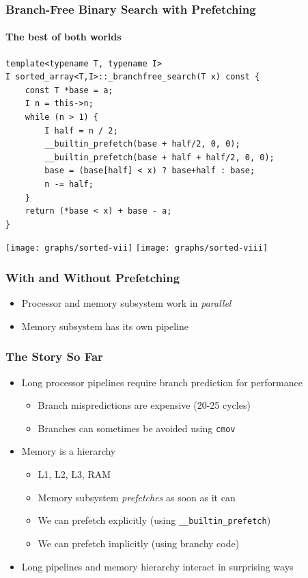 \documentclass[xcolor=dvipsnames]{beamer}
\begin{document}
\begin{frame}[fragile]
   \frametitle{Branch-Free Binary Search with Prefetching}
   \framesubtitle{The best of both worlds}

   {\tiny
   \begin{verbatim}
template<typename T, typename I>
I sorted_array<T,I>::_branchfree_search(T x) const {
    const T *base = a;
    I n = this->n;
    while (n > 1) {
        I half = n / 2;
        __builtin_prefetch(base + half/2, 0, 0);
        __builtin_prefetch(base + half + half/2, 0, 0);
        base = (base[half] < x) ? base+half : base;
        n -= half;
    }
    return (*base < x) + base - a;
}
   \end{verbatim}
   }
   \texttt{[image: graphs/sorted-vii]}
   \texttt{[image: graphs/sorted-viii]}

\end{frame}

\begin{frame}[fragile]
   \frametitle{With and Without Prefetching}

   \begin{center}
   \end{center}
   \begin{itemize}[<+->]
     \item Processor and memory subsystem work in \emph{parallel}
     \item Memory subsystem has its own pipeline
   \end{itemize}
\end{frame}


\begin{frame}[fragile]
   \frametitle{The Story So Far}

   \begin{itemize}
      \item<+->Long processor pipelines require branch prediction
               for performance
      \begin{itemize}
         \item<+->Branch mispredictions are expensive (20-25 cycles)
         \item<+->Branches can sometimes be avoided using 
                  \texttt{cmov}
      \end{itemize}
      \item<+->Memory is a hierarchy
      \begin{itemize}
         \item<+->L1, L2, L3, RAM%
            \only<+->{,\ldots}
         \item<+->Memory subsystem \emph{prefetches} as soon as it can
         \item<+->We can prefetch explicitly (using \texttt{__builtin_prefetch})
         \item<+->We can prefetch implicitly (using branchy code)
      \end{itemize}
      \item<+->Long pipelines and memory hierarchy interact in surprising
               ways
   \end{itemize}
\end{frame}
\end{document}
